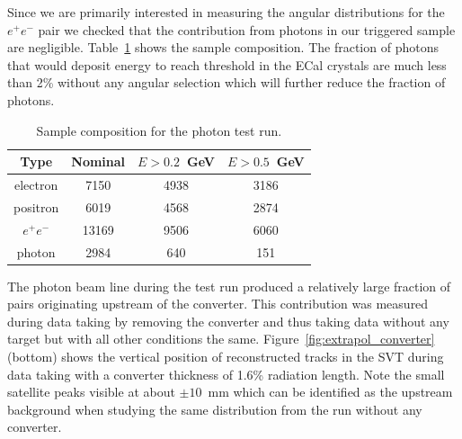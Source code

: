 
Since we are primarily interested in measuring the angular 
distributions for the $e^+e^-$ pair we checked that the contribution from photons in our triggered sample are negligible. Table~\ref{tab:sample_composition} shows the sample composition. The fraction of photons that would deposit energy to reach threshold in the ECal crystals are much less than 2\% without any angular selection which will further reduce the fraction of photons. 
\begin{table}[]
\centering
\begin{tabular}{c|c|c|c}
Type & Nominal & $E>0.2$~GeV & $E>0.5$~GeV \\
\hline
electron & 7150 & 4938 & 3186 \\
positron & 6019 & 4568 & 2874 \\
$e^+e^-$ & 13169 & 9506 & 6060 \\
photon & 2984 & 640 & 151 \\
\hline
\end{tabular}
\caption{Sample composition for the photon test run.}
\label{tab:sample_composition}
\end{table}

The photon beam line during the test run produced a relatively large fraction of pairs 
originating upstream of the converter. This contribution was measured during data taking by 
removing the converter and thus taking data without any target but with all other conditions 
the same. Figure~\ref{fig:extrapol_converter} (bottom) shows the vertical position of 
reconstructed tracks in the SVT during data taking with a converter thickness of 
1.6\% radiation length. Note the small satellite peaks visible at about $\pm 10$~mm which 
can be identified as the upstream background when studying the same distribution from the 
run without any converter. 

